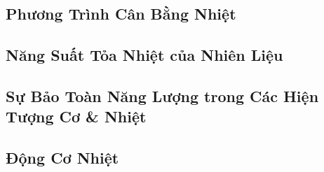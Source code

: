 \documentclass{article}
\numberwithin{equation}{section}
\begin{document}

\subsection{Phương Trình Cân Bằng Nhiệt}


\subsection{Năng Suất Tỏa Nhiệt của Nhiên Liệu}


\subsection{Sự Bảo Toàn Năng Lượng trong Các Hiện Tượng Cơ \& Nhiệt}


\subsection{Động Cơ Nhiệt}


\printbibliography[heading=bibintoc]
	
\end{document}
